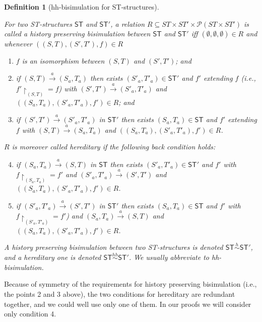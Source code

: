 \documentclass[submission,copyright,creativecommons]{eptcs}
\newtheorem{definition}[theorem]{Definition}
\newcommand\ST{\ensuremath{\mathsf{ST}}}
\newcommand\hhequiv{\ensuremath{\stackrel{hh}{\sim}}}
\newcommand\hequiv{\ensuremath{\stackrel{h}{\sim}}}
\newcommand{\transition}[1]{\ensuremath{\xrightarrow{#1}}}
\begin{document}
\begin{definition}[hh-bisimulation for ST-structures]\label{def_hh_ST}\ 

For two ST-structures $\mathsf{ST}$ and $\mathsf{ST}'$, a relation $R\!\subseteq\!ST\!\!\times\!\!ST'\!\!\times\!\!\mathcal{P}(ST\!\!\times\!\!ST')$ is called a history preserving bisimulation between $\mathsf{ST}$ and $\mathsf{ST}'$ iff $(\emptyset,\emptyset,\emptyset)\!\in\!R$ and whenever $((S,T),(S',T'),f)\!\in\!R$

\begin{enumerate}
\item $f$ is an isomorphism between $(S,T)$ and $(S',T')$; and
\item if $(S,T)\transition{a}(S_a,T_a)$ then exists $(S'_a,T'_a)\in\mathsf{ST}'$ and $f'$ extending $f$ (i.e., $f'\!\!\upharpoonright_{(S,T)}=f$) with $(S',T')\transition{a}(S'_a,T'_a)$ and  $((S_a,T_a),(S'_a,T'_a),f')\in R$; and
\item if $(S',T')\transition{a}(S'_a,T'_a)$ in $\mathsf{ST}'$ then exists $(S_a,T_a)\in\mathsf{ST}$ and $f'$ extending $f$ with $(S,T)\transition{a}(S_a,T_a)$ and $((S_a,T_a),(S'_a,T'_a),f')\in R$.
\end{enumerate}
$R$ is moreover called \emph{hereditary} if the following back condition holds:
\begin{enumerate}
\setcounter{enumi}{3}
\item if $(S_a,T_a)\transition{a}(S,T)$ in $\mathsf{ST}$ then exists $(S'_a,T'_a)\in\mathsf{ST}'$ and $f'$ with $f\!\!\upharpoonright_{(S_a,T_a)}=f'$ and $(S'_a,T'_a)\transition{a}(S',T')$ and  $((S_a,T_a),(S'_a,T'_a),f')\in R$.
\item if $(S'_a,T'_a)\transition{a}(S',T')$ in $\mathsf{ST}'$ then exists $(S_a,T_a)\!\in\!\mathsf{ST}$ and $f'$ with $f\!\!\upharpoonright_{(S'_a,T'_a)}=f'$) and $(S_a,T_a)\transition{a}(S,T)$ and  $((S_a,T_a),(S'_a,T'_a),f')\in R$.
\end{enumerate}
A history preserving bisimulation between two ST-structures is denoted $\ST\hequiv\ST'$, and a hereditary one is denoted $\ST\hhequiv\ST'$. We usually abbreviate to hh-bisimulation.
\end{definition}

Because of symmetry of the requirements for history preserving bisimulation (i.e., the points 2 and 3 above), the two conditions for hereditary are redundant together, and we could well use only one of them. In our proofs we will consider only condition 4.
\end{document}
